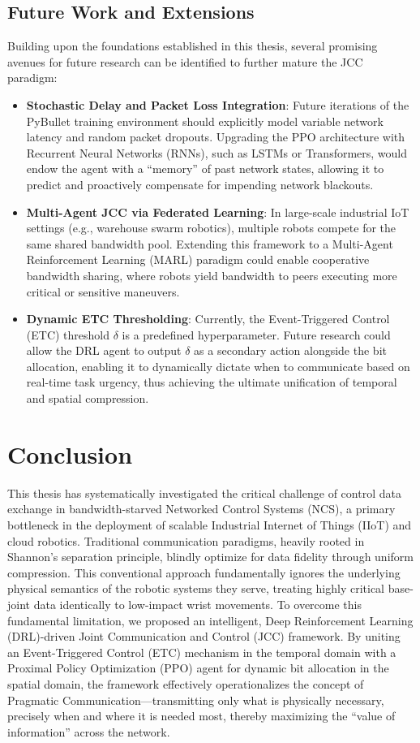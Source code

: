 \subsection{Future Work and Extensions}
Building upon the foundations established in this thesis, several promising avenues for future research can be identified to further mature 
the JCC paradigm:
\begin{itemize}
    \item \textbf{Stochastic Delay and Packet Loss Integration}: Future iterations of the PyBullet training environment should explicitly model variable 
          network latency and random packet dropouts. Upgrading the PPO architecture with Recurrent Neural Networks (RNNs), such as LSTMs or Transformers, would endow the agent with a ``memory'' of past network states, allowing it to predict and proactively compensate for impending network blackouts.
    \item \textbf{Multi-Agent JCC via Federated Learning}: In large-scale industrial IoT settings (e.g., warehouse swarm robotics), multiple robots compete for the same shared bandwidth pool. Extending this framework to a Multi-Agent Reinforcement Learning (MARL) paradigm could enable cooperative bandwidth sharing, where robots yield bandwidth to peers executing more critical or sensitive maneuvers.
    \item \textbf{Dynamic ETC Thresholding}: Currently, the Event-Triggered Control (ETC) threshold $\delta$ is a predefined hyperparameter. Future research could allow the DRL agent to output $\delta$ as a secondary action alongside the bit allocation, enabling it to dynamically dictate when to communicate based on real-time task urgency, thus achieving the ultimate unification of temporal and spatial compression.
\end{itemize}
\section{Conclusion}
This thesis has systematically investigated the critical challenge of control data exchange in bandwidth-starved Networked Control Systems (NCS), a primary bottleneck in the deployment of scalable Industrial Internet of Things (IIoT) and cloud robotics. 
Traditional communication paradigms, heavily rooted in Shannon's separation principle, blindly optimize for data fidelity through uniform compression. This conventional approach fundamentally ignores the underlying physical semantics of the robotic systems they serve, treating highly critical base-joint data identically to low-impact wrist movements. 
To overcome this fundamental limitation, we proposed an intelligent, Deep Reinforcement Learning (DRL)-driven Joint Communication and Control (JCC) framework. 
By uniting an Event-Triggered Control (ETC) mechanism in the temporal domain with a Proximal Policy Optimization (PPO) agent for dynamic bit allocation in the spatial domain, the framework effectively operationalizes the concept of Pragmatic Communication—transmitting only what is physically necessary, precisely when and where it is needed most, thereby maximizing the ``value of information'' across the network.

